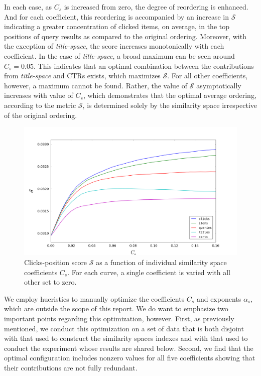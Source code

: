 \documentclass{article}
\begin{document}
In each case, as $C_s$ is increased from zero, the degree of reordering is
enhanced.  And for each coefficient, this reordering is accompanied by an
increase in $\mathscr{S}$ indicating a greater concentration of clicked items,
on average, in the top positions of query results as compared to the original
ordering.  Moreover, with the exception of {\em title-space}, the score
increases monotonically with each coefficient. In the case of {\em
title-space}, a broad maximum can be seen around $C_s = 0.05$. This indicates
that an optimal combination between the contributions from {\em title-space}
and CTRs exists, which maximizes $\mathscr{S}$. For all other coefficients,
however, a maximum cannot be found. Rather, the value of $\mathscr{S}$
asymptotically increases with value of $C_s$, which demonstrates that the
optimal average ordering, according to the metric $\mathscr{S}$, is determined
solely by the similarity space irrespective of the original ordering.

\begin{figure}[htbp!]
    \centering
    \includegraphics[width=\textwidth]{000050_0_48chunk_k100_i2_n100_avg_click_position_score_0-0_16.png}
    \caption{Clicks-position score $\mathscr{S}$ as a function of individual similarity space coefficients $C_s$. For each curve, a single coefficient is varied with all other set to zero.}
    \label{fig:avg_clicks_position_score}
\end{figure}

We employ hueristics to manually optimize the coefficients $C_s$ and exponents
$\alpha_s$, which are outside the scope of this report. We do want to emphasize
two important points regarding this optimization, however. First, as previously
mentioned, we conduct this optimization on a set of data that is both disjoint
with that used to construct the similarity spaces indexes and with that used to
conduct the experiment whose results are shared below. Second, we find that the
optimal configuration includes nonzero values for all five coefficients showing
that their contributions are not fully redundant.
\end{document}
